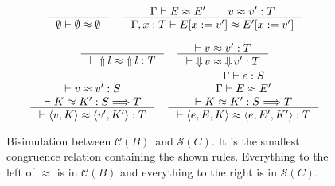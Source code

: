 \documentclass[runningheads]{llncs}
\newcommand{\infr}[2]{\inference{#1}{#2}}
\newcommand{\CMachine}[1]{\ensuremath{\mathcal{C}(#1)}}
\newcommand{\CBMachine}[0]{\CMachine{B}}
\newcommand{\SMachine}[1]{\ensuremath{\mathcal{S}(#1)}}
\newcommand{\error}[1]{\ensuremath{\mathop{\Uparrow}#1}}
\newcommand{\ecast}[2]{\ensuremath{#1 : #2}}
\newcommand{\ccast}[3]{#1 \xRightarrow[]{\enskip #2 \enskip} #3}
\newcommand{\sexpr}[3]{\ensuremath{\langle#1,#2,#3\rangle}}
\newcommand{\scont}[2]{\ensuremath{\langle#1,#2\rangle}}
\newcommand{\shalt}[1]{\ensuremath{\mathop{\Downarrow} #1}}
\newcommand{\Kcons}[2]{[#1]#2}
\newcommand{\Fcast}[1]{\ecast{\square}{#1}}
\newcommand{\compose}[2]{\ensuremath{#1 \fatsemi #2}}
\newcommand{\translate}[1]{\ensuremath{\lceil#1\rceil}}
\newcommand{\expressiontyping}[3]{\ensuremath{#1 \vdash #2 : #3}}
\newcommand{\valuetyping}[2]{\ensuremath{\vdash #1 : #2}}
\newcommand{\casttyping}[3]{\ensuremath{\vdash #1 : #2 \Longrightarrow #3}}
\newcommand{\bisimE}[3]{\ensuremath{#1 \vdash #2 \approx #3}}
\newcommand{\bisimv}[3]{\valuetyping{#1 \approx #2}{#3}}
\newcommand{\bisimc}[4]{\casttyping{#1 \approx #2}{#3}{#4}}
\newcommand{\bisimK}[4]{\casttyping{#1 \approx #2}{#3}{#4}}
\newcommand{\bisims}[3]{\valuetyping{\ensuremath{#1 \approx #2}}{#3}}
\begin{document}
\begin{figure}[tp]
\fbox{\bisimE{\Gamma}{E}{E}}
\begin{gather*}
\inference{
}{
	\bisimE{\emptyset}{\emptyset}{\emptyset}
}
\quad
\inference{
	\Gamma \vdash E \approx E' \qquad
	v \approx v' : T
}{
	\Gamma , x : T \vdash 
	E [ x := v' ] \approx E' [ x := v' ]
}
\end{gather*}

\fbox{\bisims{s}{s}{T}}
\begin{gather*}
\infr{}{\bisims{\error{l}}{\error{l}}{T}} \quad
\infr{
	\bisimv{v}{v'}{T}
}{
	\bisims{\shalt{v}}{\shalt{v'}}{T}
}
\\
\infr{
	\bisimv{v}{v'}{S} \\
	\bisimK{K}{K'}{S}{T}
}{
	\bisims{\scont{v}{K}}{\scont{v'}{K'}}{T}
} \quad
\infr{
	\expressiontyping{\Gamma}{e}{S} \\
	\bisimE{\Gamma}{E}{E'}          \\
	\bisimK{K}{K'}{S}{T}
}{
	\bisims{\sexpr{e}{E}{K}}{\sexpr{e}{E'}{K'}}{T}
}
\end{gather*}

\caption{Bisimulation between \CBMachine\ and \SMachine{C}. It is the
  smallest congruence relation containing the shown rules. Everything
  to the left of $\approx$ is in \CMachine{B} and everything to the
  right is in \SMachine{C}.}
\label{fig:bisim-SC-D}
\end{figure}



\end{document}
